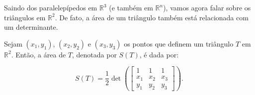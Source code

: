 Saindo dos paralelepípedos em $\mathbb{R}^3$ (e também em $\mathbb{R}^n$), vamos agora falar sobre os triângulos em $\mathbb{R}^2$. De fato, a área de um triângulo também está relacionada com um determinante.

\begin{Theorem}
	Sejam $(x_1, y_1)$, $(x_2, y_2)$ e $(x_3, y_3)$ os pontos que definem um triângulo $T$ em $\mathbb{R}^2$. Então, a área de $T$, denotada por $S(T)$, é dada por:
	
	$$
	S(T) = \dfrac{1}{2}\det\left(\begin{bmatrix}
		1 & 1 & 1 \\
		x_1 & x_2 & x_3 \\
		y_1 & y_2 & y_3
	\end{bmatrix}\right).
	$$
\end{Theorem}

